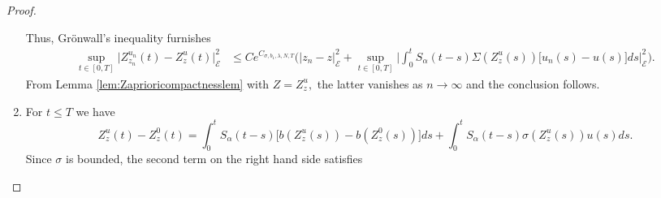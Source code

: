 \documentclass[10pt, reqno]{amsart}
\newcommand{\e}{\mathcal{E}}
\theoremstyle{definition}
\numberwithin{lem}{section}
\numberwithin{cor}{section}
\numberwithin{prop}{section}
\numberwithin{thm}{section}
\numberwithin{dfn}{section}
\begin{document}
\begin{proof}
\begin{enumerate}
\begin{equation*}
\end{equation*}
Thus, Gr\"onwall's inequality furnishes
\begin{equation*}
\begin{aligned}
\sup_{t\in[0,T]}|Z^{u_n}_{z_n}(t)-Z^{u}_{z}(t)\big|^2_{\e}&
\leq Ce^{C_{\sigma, b_1, \lambda, N, T}}\bigg(| z_n-z|^2_{\e}+\sup_{t\in[0,T]}\bigg|\int_{0}^{t}S_\alpha(t-s) \Sigma(Z^{u}_{z}(s))\big[u_n(s)-u(s)\big]ds\bigg|^2_{\e}\bigg).
\end{aligned}
\end{equation*}
From Lemma \ref{lem:Zaprioricompactnesslem} with $Z=Z^{u}_{z},$ the latter vanishes as $n\to\infty$ and the conclusion follows.
\item 
For $t\leq T$ we have 
\begin{equation*}
   Z_z^u(t)-Z_z^0(t)=\int_{0}^tS_\alpha(t-s)\big[b(  Z_z^u(s))- b(  Z_z^0(s))\big]ds+\int_{0}^tS_\alpha(t-s)\sigma(  Z_z^u(s))u(s)ds.
\end{equation*}
Since $\sigma$ is bounded, the second term on the right hand side satisfies 


\end{enumerate}
\end{proof}
\end{document}
